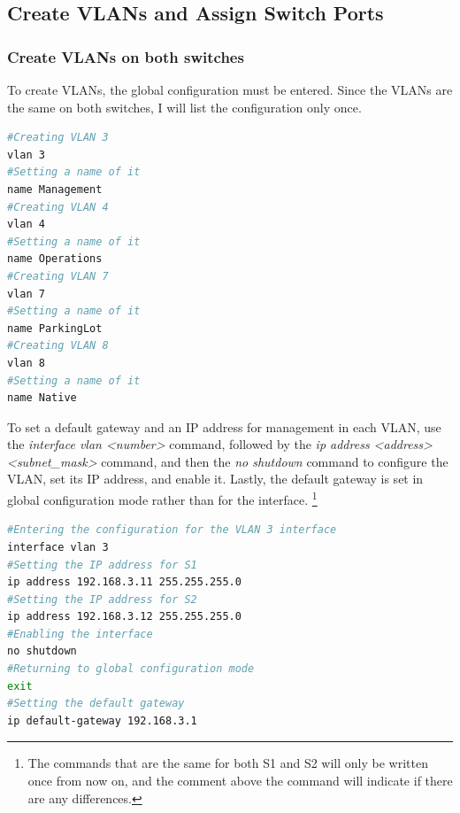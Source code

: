 \documentclass[a4paper]{article}
\newcommand{\ii}{\textit}
\begin{document}
\subsection{Create VLANs and Assign Switch Ports}
\subsubsection{Create VLANs on both switches}
To create VLANs, the global configuration must be entered. Since the VLANs are the same on both switches, I will list the configuration only once.
\begin{lstlisting}[language=bash]
#Creating VLAN 3
vlan 3
#Setting a name of it
name Management
#Creating VLAN 4
vlan 4
#Setting a name of it
name Operations
#Creating VLAN 7
vlan 7
#Setting a name of it
name ParkingLot
#Creating VLAN 8
vlan 8
#Setting a name of it
name Native
\end{lstlisting}
To set a default gateway and an IP address for management in each VLAN, use the \ii{interface vlan <number>} command, followed by the \ii{ip address <address> <subnet\_mask>} command, and then the \ii{no shutdown} command to configure the VLAN, set its IP address, and enable it.
Lastly, the default gateway is set in global configuration mode rather than for the interface. \footnote{The commands that are the same for both S1 and S2 will only be written once from now on, and the comment above the command will indicate if there are any differences.}
\begin{lstlisting}[language=bash]
#Entering the configuration for the VLAN 3 interface
interface vlan 3
#Setting the IP address for S1
ip address 192.168.3.11 255.255.255.0
#Setting the IP address for S2
ip address 192.168.3.12 255.255.255.0
#Enabling the interface
no shutdown
#Returning to global configuration mode
exit
#Setting the default gateway
ip default-gateway 192.168.3.1
\end{lstlisting}
\end{document}
